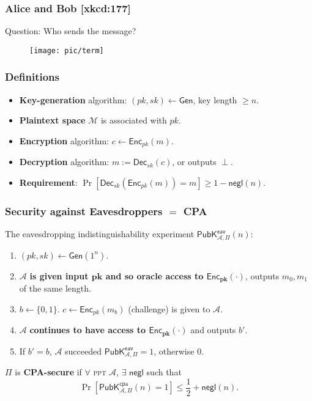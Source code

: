 \begin{frame}\frametitle{Alice and Bob [xkcd:177]}
Question: Who sends the message?
\begin{figure}
\begin{center}
\texttt{[image: pic/term]} 
\end{center}
\end{figure}
\end{frame}
\begin{frame}\frametitle{Definitions}
\begin{figure}
\begin{center}

\end{center}
\end{figure}
\begin{itemize}
\item \textbf{Key-generation} algorithm: $(pk,sk) \gets \mathsf{Gen}$, key length $\ge n$.
\item  \textbf{Plaintext space} $\mathcal{M}$ is associated with $pk$.
\item \textbf{Encryption} algorithm: $c \gets \mathsf{Enc}_{pk}(m)$.
\item \textbf{Decryption} algorithm: $m:= \mathsf{Dec}_{sk}(c)$, or outputs $\perp$.
\item \textbf{Requirement}: $\Pr[\mathsf{Dec}_{sk}(\mathsf{Enc}_{pk}(m)) = m] \ge 1 - \mathsf{negl}(n)$.
\end{itemize}
\end{frame}
\begin{frame}\frametitle{Security against Eavesdroppers $=$ CPA}
The eavesdropping indistinguishability experiment $\mathsf{PubK}^{\mathsf{eav}}_{\mathcal{A},\Pi}(n)$:
\begin{enumerate}
\item $(pk,sk) \gets \mathsf{Gen}(1^n)$.
\item $\mathcal{A}$ \textbf{is given input $\mathbf{pk}$ and so oracle access to $\mathbf{\mathsf{Enc}_{pk}(\cdot)}$}, outputs $m_0, m_1$ of the same length. 
\item $b \gets \{0,1\}$. $c \gets \mathsf{Enc}_{pk}(m_b)$ (challenge) is given to $\mathcal{A}$.
\item $\mathcal{A}$ \textbf{continues to have access to $\mathbf{\mathsf{Enc}_{pk}(\cdot)}$} and outputs $b'$.
\item If $b' = b$, $\mathcal{A}$ succeeded $\mathsf{PubK}^{\mathsf{eav}}_{\mathcal{A},\Pi}=1$, otherwise 0.
\end{enumerate}
\begin{definition}
$\Pi$ is \textbf{CPA-secure} if $\forall$ \textsc{ppt} $\mathcal{A}$, $\exists$ $\mathsf{negl}$ such that
\[ \Pr\left[\mathsf{PubK}^{\mathsf{cpa}}_{\mathcal{A},\Pi}(n)=1\right] \le \frac{1}{2} + \mathsf{negl}(n). \]
\end{definition}
\end{frame}
